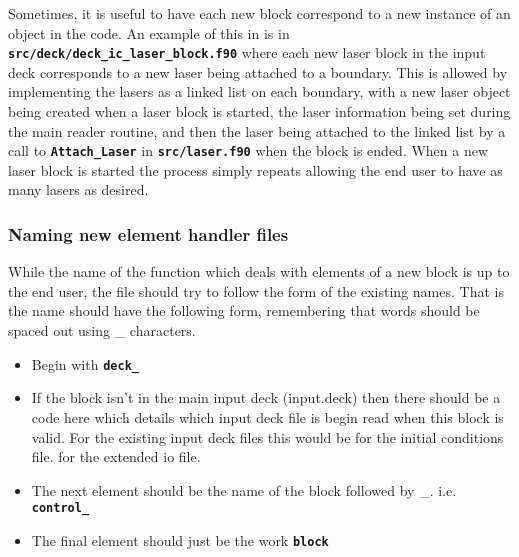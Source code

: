 \documentclass[12pt,a4paper]{article}
\newcommand{\inlinecode}[1]{{\color{warwickred} \bf\texttt{#1}}}
\newcommand{\EPOCH}{{\color{warwickdark}\fontfamily{phv}\selectfont{EPOCH}}}
\begin{document}
Sometimes, it is useful to have each new block correspond to a new instance of
an object in the code. An example of this in {\EPOCH} is in
\inlinecode{src/deck/deck\_ic\_laser\_block.f90} where each new laser block in
the input deck corresponds to a new laser being attached to a boundary. This is
allowed by implementing the lasers as a linked list on each boundary, with a
new laser object being created when a laser block is started, the laser
information being set during the main reader routine, and then the laser being
attached to the linked list by a call to \inlinecode{Attach\_Laser} in
\inlinecode{src/laser.f90} when the block is ended. When a new laser block is
started the process simply repeats allowing the end user to have as many lasers
as desired.

\subsubsection{Naming new element handler files}
While the name of the function which deals with elements of a new block is up
to the end user, the file should try to follow the form of the existing
names. That is the name should have the following form, remembering that words
should be spaced out using \_ characters.
\begin{itemize}
\item Begin with \inlinecode{deck\_}
\item If the block isn't in the main input deck (input.deck) then there
  should be a code here which details which input deck file is begin read
  when this block is valid. For the existing input deck files this would be
  \subitem \inlinecode{ic\_} for the initial conditions file.
  \subitem \inlinecode{eio\_} for the extended io file.
\item The next element should be the name of the block followed by \_.
  i.e. \inlinecode{control\_}
\item The final element should just be the work \inlinecode{block}
\end{itemize}
\end{document}
